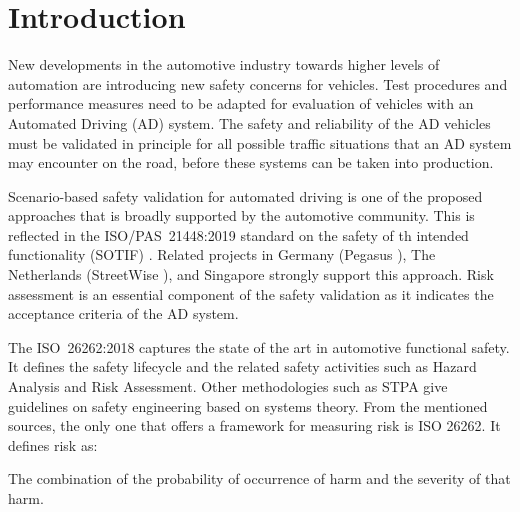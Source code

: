 \section{Introduction}


New developments in the automotive industry towards higher levels of automation are introducing new safety concerns for vehicles. Test procedures and performance measures need to be adapted for evaluation of vehicles with an Automated Driving (AD) system. The safety and reliability of the AD vehicles must be validated in principle for all possible traffic situations that an AD system may encounter on the road, before these systems can be taken into production.

Scenario-based safety validation for automated driving is one of the proposed approaches that is broadly supported by the automotive community. This is reflected in the ISO/PAS~21448:2019 standard on the safety of th intended functionality (SOTIF) \cite{ISO21448}. Related projects in Germany (Pegasus \cite{putz2017pegasus}), The Netherlands (StreetWise \cite{elrofai2018scenario}), and Singapore \cite{ploeg2018cetran} strongly support this approach. Risk assessment is an essential component of the safety validation as it indicates the acceptance criteria of the AD system.

The ISO~26262:2018 \cite{ISO26262} captures the state of the art in automotive functional safety. It defines the safety lifecycle and the related safety activities such as Hazard Analysis and Risk Assessment. Other methodologies such as STPA \cite{leveson2013stpa} give guidelines on safety engineering based on systems theory. From the mentioned sources, the only one that offers a framework for measuring risk is ISO 26262. It defines risk as:
\begin{definition}
	The combination of the probability of occurrence of harm and the severity of that harm.
\end{definition}

